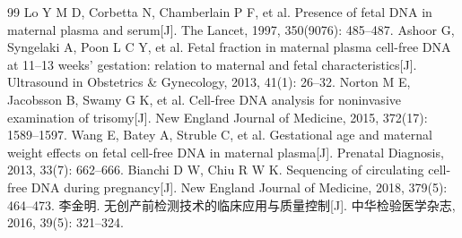 
\begin{thebibliography}{99}
 Lo Y M D, Corbetta N, Chamberlain P F, et al. Presence of fetal DNA in maternal plasma and serum[J]. The Lancet, 1997, 350(9076): 485--487.
 Ashoor G, Syngelaki A, Poon L C Y, et al. Fetal fraction in maternal plasma cell-free DNA at 11--13 weeks' gestation: relation to maternal and fetal characteristics[J]. Ultrasound in Obstetrics \& Gynecology, 2013, 41(1): 26--32.
 Norton M E, Jacobsson B, Swamy G K, et al. Cell-free DNA analysis for noninvasive examination of trisomy[J]. New England Journal of Medicine, 2015, 372(17): 1589--1597.
 Wang E, Batey A, Struble C, et al. Gestational age and maternal weight effects on fetal cell-free DNA in maternal plasma[J]. Prenatal Diagnosis, 2013, 33(7): 662--666.
 Bianchi D W, Chiu R W K. Sequencing of circulating cell-free DNA during pregnancy[J]. New England Journal of Medicine, 2018, 379(5): 464--473.
 李金明. 无创产前检测技术的临床应用与质量控制[J]. 中华检验医学杂志, 2016, 39(5): 321--324.
\end{thebibliography}
